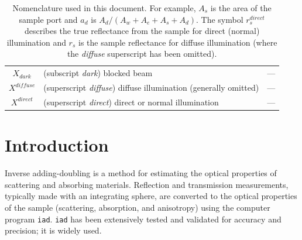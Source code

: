 \documentclass{article}
\newcommand\iadprog{\texttt{iad}}
\begin{document}
\begin{table}[b]
\begin{tabular}{cp{7cm}c}
$X_\mathit{dark}$ & (subscript \textit{dark}) blocked beam & ---\\
$X^{\mathit{diffuse}}$ & (superscript \textit{diffuse})  diffuse illumination (generally omitted)& ---\\
$X^{\mathit{direct}}$ & (superscript \textit{direct})  direct or normal illumination & ---\\
\end{tabular}
\caption{Nomenclature used in this document.  For example,
$A_s$ is the area of the sample port and $a_d$ is $A_d/(A_w+A_e+A_s+A_d)$.
The symbol
$r_s^\mathit{direct}$ describes the true reflectance from the sample
for direct (normal) illumination and $r_s$ is the sample reflectance
for diffuse illumination (where the \textit{diffuse} superscript has
been omitted).}
\end{table}


\clearpage
\section{Introduction}

Inverse adding-doubling is a method for estimating the optical properties of
scattering and absorbing materials.  Reflection and transmission measurements,
typically made with an integrating sphere, are converted to the optical
properties of the sample (scattering, absorption, and anisotropy) using the
computer program \iadprog{}.
\iadprog{} has been extensively tested and validated for accuracy and
precision; it is widely used\cite{chen06,chandra06,gebhart06,mishra06,degrand06,
giraev06,bargo05,bashkatov05,itoh05,zhao05,sardar05,chen05,thennadil05,jaeger05,
drakaki05,bashkatov05a,gebhart05,ramella-roman05,genina05,liu05,collier05,
swartling05,choi05,trivedi05,bashkatov04,klose05,black04,maswadi04,sardar04,
carp04,khan04,kim04,huber04,choi03,zhu03,lin03,collier03,das03,schulkin03,
rath03,swartling03,fabbri03,gannot03,pfefer03,zaccanti02,shimada02,villard02,
moffitt01,sardar01,sefkow01,shimada01,guo01,barton01,sardar01a,troy01,shah01,
du01,shimada00,youn00,morin00,dam00,barton99,balgi99,vries99,barton99a,nau99,
jones99,simpson98,michielsen98,sardar98,smithpeter98,verkruysse98,jacques98,
fukshansky-kaz98,beek97,tuchin97,chan96,vanstaveren97,coremans97,nilsson97,
yaroslavsky96,richardskortum96,sadhwani96,chan96a,nemati96,lin96,vanstaveren95,
vanstaveren96,gardner96,saidi95,proskurin95,papaioannou95,vanstaveren95a,
nilsson95,marquet95,eddowes95,hourdakis95,qu94,pickering94,tuchin94,
vanstaveren94,durkin93,pickering93,pickering93a}. 
\end{document}
